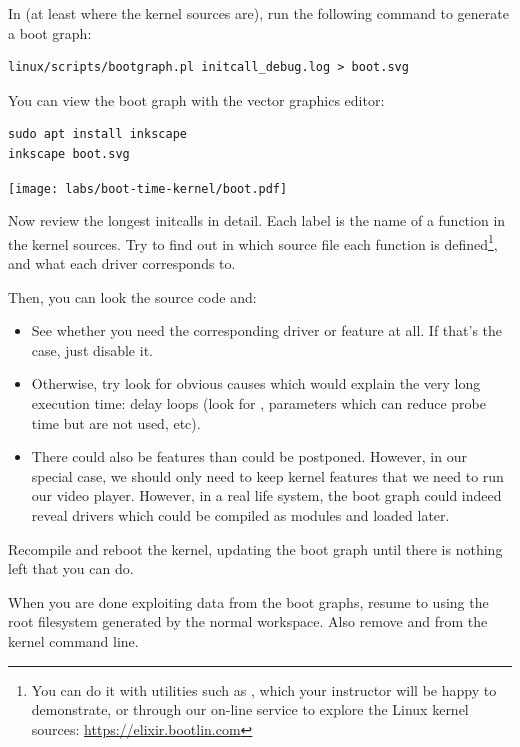 In  (at least where the kernel sources
are), run the following command to generate a boot graph:

\begin{verbatim}
linux/scripts/bootgraph.pl initcall_debug.log > boot.svg
\end{verbatim}

You can view the boot graph with the  vector graphics
editor:

\begin{verbatim}
sudo apt install inkscape
inkscape boot.svg
\end{verbatim}

\begin{center}
\texttt{[image: labs/boot-time-kernel/boot.pdf]}
\end{center}

Now review the longest initcalls in detail. Each label is the name of
a function in the kernel sources. Try to find out in which source file
each function is defined\footnote{You can do it with utilities such as
, which your instructor will be happy to demonstrate,
or through our on-line service to explore the Linux kernel sources:
\url{https://elixir.bootlin.com}}, and what each driver corresponds
to.

Then, you can look the source code and:
\begin{itemize}
\item See whether you need the corresponding driver or feature at all.
If that's the case, just disable it.
\item Otherwise, try look for obvious causes which
would explain the very long execution time: delay loops (look for
, parameters which can reduce probe time but are not used,
etc).
\item There could also be features than could be postponed.
However, in our special case, we should
only need to keep kernel features that we need to run our video player.
However, in a real life system, the boot graph could indeed reveal
drivers which could be compiled as modules and loaded later.
\end{itemize}

Recompile and reboot the kernel, updating the boot graph until there is
nothing left that you can do.

When you are done exploiting data from the boot graphs, resume
to using the root filesystem generated by the normal 
workspace. Also remove  and 
from the kernel command line.

